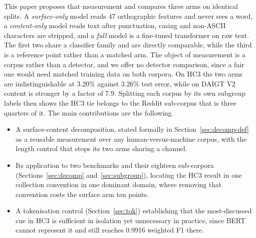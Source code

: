 This paper proposes that measurement and compares three arms on identical splits. A \emph{surface-only} model reads 47 orthographic features and never sees a word, a \emph{content-only} model reads text after punctuation, casing and non-ASCII characters are stripped, and a \emph{full} model is a fine-tuned transformer on raw text. The first two share a classifier family and are directly comparable, while the third is a reference point rather than a matched arm. The object of measurement is a corpus rather than a detector, and we offer no detector comparison, since a fair one would need matched training data on both corpora. On HC3 the two arms are indistinguishable at 3.20\% against 3.26\% test error, while on DAIGT V2 content is stronger by a factor of 7.9. Splitting each corpus by its own subgroup labels then shows the HC3 tie belongs to the Reddit sub-corpus that is three quarters of it. The main contributions are the following.
\begin{itemize}
\item A surface-content decomposition, stated formally in Section~\ref{sec:decomp-def} as a reusable measurement over any human-versus-machine corpus, with the length control that stops its two arms sharing a channel.
\item Its application to two benchmarks and their eighteen sub-corpora (Sections~\ref{sec:decomp} and~\ref{sec:subgroup}), locating the HC3 result in one collection convention in one dominant domain, where removing that convention costs the surface arm ten points.
\item A tokenisation control (Section~\ref{sec:tok}) establishing that the most-discussed cue in HC3 is sufficient in isolation yet unnecessary in practice, since BERT cannot represent it and still reaches 0.9916 weighted F1 there.
\end{itemize}
